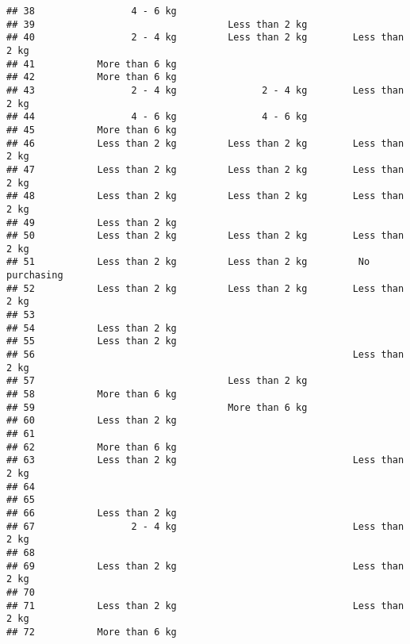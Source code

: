 \documentclass[
]{article}
\begin{document}
\begin{verbatim}
## 38                 4 - 6 kg                                             
## 39                                  Less than 2 kg                      
## 40                 2 - 4 kg         Less than 2 kg        Less than 2 kg
## 41           More than 6 kg                                             
## 42           More than 6 kg                                             
## 43                 2 - 4 kg               2 - 4 kg        Less than 2 kg
## 44                 4 - 6 kg               4 - 6 kg                      
## 45           More than 6 kg                                             
## 46           Less than 2 kg         Less than 2 kg        Less than 2 kg
## 47           Less than 2 kg         Less than 2 kg        Less than 2 kg
## 48           Less than 2 kg         Less than 2 kg        Less than 2 kg
## 49           Less than 2 kg                                             
## 50           Less than 2 kg         Less than 2 kg        Less than 2 kg
## 51           Less than 2 kg         Less than 2 kg         No purchasing
## 52           Less than 2 kg         Less than 2 kg        Less than 2 kg
## 53                                                                      
## 54           Less than 2 kg                                             
## 55           Less than 2 kg                                             
## 56                                                        Less than 2 kg
## 57                                  Less than 2 kg                      
## 58           More than 6 kg                                             
## 59                                  More than 6 kg                      
## 60           Less than 2 kg                                             
## 61                                                                      
## 62           More than 6 kg                                             
## 63           Less than 2 kg                               Less than 2 kg
## 64                                                                      
## 65                                                                      
## 66           Less than 2 kg                                             
## 67                 2 - 4 kg                               Less than 2 kg
## 68                                                                      
## 69           Less than 2 kg                               Less than 2 kg
## 70                                                                      
## 71           Less than 2 kg                               Less than 2 kg
## 72           More than 6 kg                                             

\end{verbatim}
\end{document}
